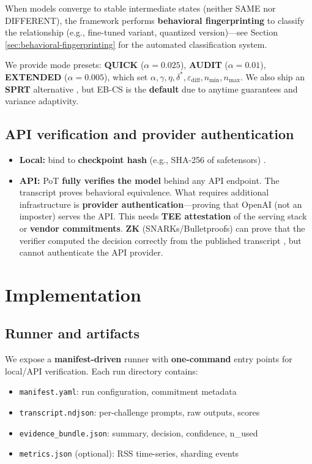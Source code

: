 \documentclass{article}
\begin{document}
When models converge to stable intermediate states (neither SAME nor DIFFERENT), the framework performs \textbf{behavioral fingerprinting} to classify the relationship (e.g., fine-tuned variant, quantized version)---see Section \ref{sec:behavioral-fingerprinting} for the automated classification system.

We provide mode presets: \textbf{QUICK} ($\alpha=0.025$), \textbf{AUDIT} ($\alpha=0.01$), \textbf{EXTENDED} ($\alpha=0.005$), which set $\alpha,\gamma,\eta,\delta^*,\varepsilon_{\text{diff}},n_{\min},n_{\max}$. We also ship an \textbf{SPRT} alternative \cite{wald1945sprt}, but EB-CS is the \textbf{default} due to anytime guarantees and variance adaptivity.

\subsection{API verification and provider authentication}
\label{sec:api-verification}

\begin{itemize}
\item \textbf{Local:} bind to \textbf{checkpoint hash} (e.g., SHA-256 of safetensors) \cite{fips180-4}.
\item \textbf{API:} PoT \textbf{fully verifies the model} behind any API endpoint. The transcript proves behavioral equivalence. What requires additional infrastructure is \textbf{provider authentication}---proving that OpenAI (not an imposter) serves the API. This needs \textbf{TEE attestation} of the serving stack or \textbf{vendor commitments}. \textbf{ZK} (SNARKs/Bulletproofs) can prove that the verifier computed the decision correctly from the published transcript \cite{bensasson2014snarks,bunz2018bulletproofs}, but cannot authenticate the API provider.
\end{itemize}

\section{Implementation}

\subsection{Runner and artifacts}

We expose a \textbf{manifest-driven} runner with \textbf{one-command} entry points for local/API verification. Each run directory contains:
\begin{itemize}
\item \texttt{manifest.yaml}: run configuration, commitment metadata
\item \texttt{transcript.ndjson}: per-challenge prompts, raw outputs, scores
\item \texttt{evidence\_bundle.json}: summary, decision, confidence, n\_used
\item \texttt{metrics.json} (optional): RSS time-series, sharding events
\end{itemize}
\end{document}

